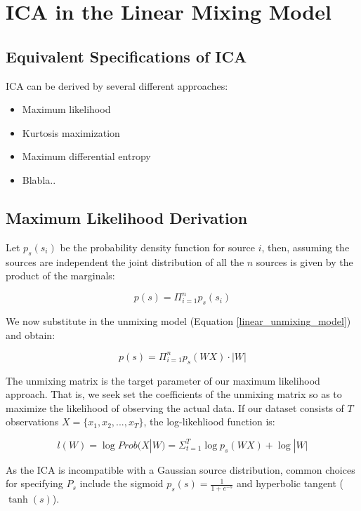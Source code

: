 \documentclass[11pt, oneside, a4paper]{report}
\begin{document}
\section{ICA in the Linear Mixing Model}

\subsection{Equivalent Specifications of ICA}

ICA can be derived by several different approaches:
\begin{itemize}
  \item Maximum likelihood
  \item Kurtosis maximization
  \item Maximum differential entropy
  \item Blabla..
\end{itemize}



\subsection{Maximum Likelihood Derivation}\label{ml_ica}

Let $p_s(s_i)$ be the probability density function for source $i$, then, assuming the sources are independent the joint distribution of all the $n$ sources is given by the product of the marginals:

\begin{equation}
  p(s) = \Pi_{i=1}^n p_s(s_i)
\end{equation}

We now substitute in the unmixing model (Equation \ref{linear_unmixing_model}) and obtain:

\begin{equation}
  p(s) = \Pi_{i=1}^n p_s(WX) \cdot |W|
\end{equation}

The unmixing matrix is the target parameter of our maximum likelihood approach. That is, we seek set the coefficients of the unmixing matrix so as to maximize the likelihood of observing the actual data. If our dataset consists of $T$ observations $X = \{x_1,x_2,...,x_T\}$, the log-likehliood function is:

\begin{equation}
  l(W) =\log Prob(X|W)= \Sigma_{t=1}^T \log p_s(WX)+\log |W|
\end{equation}

As the ICA is incompatible with a Gaussian source distribution, common choices for specifying $P_s$ include the sigmoid $p_s(s) = \frac{1}{1+e^{-s}}$ and hyperbolic tangent ($\tanh(s)$).
\end{document}
